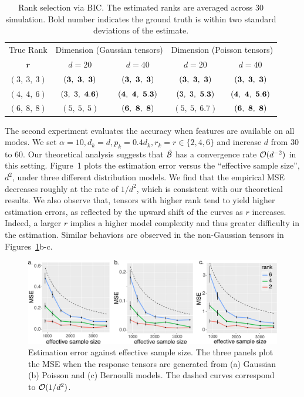 \documentclass[12pt]{article}
\theoremstyle{definition}
\theoremstyle{definition}
\begin{document}
\begin{table}[tb]
\centering
\begin{tabular}{|c|cc|cc|}
\hline
True Rank &\multicolumn{2}{c|}{Dimension (Gaussian tensors)}&\multicolumn{2}{c|}{Dimension (Poisson tensors)}\\
$\bm{r}$& $d=20$  &$d=40$&$d=20$ &$d=40$\\
\hline
$(3,\ 3,\ 3)$&$({\bf 3},\ {\bf 3},\ {\bf 3})$&$({\bf 3},\ {\bf 3},\ {\bf 3})$& $({\bf 3},\ {\bf 3},\ {\bf 3})$ & $({\bf 3},\ {\bf 3},\ {\bf 3})$\\
$(4,\ 4,\ 6)$&$(3,\ 3,\ {\bf 4.6})$&$({\bf 4},\ {\bf 4},\ {\bf 5.3})$&$(3,\ 3,\ {\bf 5.3})$&$({\bf 4},\ {\bf 4},\ {\bf 5.6})$\\
$(6,\ 8,\ 8)$&$(5,\ 5,\ 5)$&$({\bf 6},\ {\bf 8},\ {\bf 8})$&$(5,\ 5,\ 6.7)$&$({\bf 6},\ {\bf 8},\ {\bf 8})$\\
\hline
\end{tabular}
\caption{Rank selection via BIC. The estimated ranks are averaged across 30 simulation. Bold number indicates the ground truth is within two standard deviations of the estimate.}\label{tab:rank}
\end{table}


The second experiment evaluates the accuracy when features are available on all modes. We set $\alpha=10, d_k=d, p_k=0.4d_k, r_k=r\in\{2,4,6\}$ and increase $d$ from 30 to 60. Our theoretical analysis suggests that $\hat {\mathcal{B}}$ has a convergence rate $\mathcal{O}(d^{-2})$ in this setting. Figure~1 plots the estimation error versus the ``effective sample size'', $d^2$, under three different distribution models. We find that the empirical MSE decreases roughly at the rate of $1/d^2$, which is consistent with our theoretical results. We also observe that, tensors with higher rank tend to yield higher estimation errors, as reflected by the upward shift of the curves as $r$ increases. Indeed, a larger $r$ implies a higher model complexity and thus greater difficulty in the estimation. Similar behaviors are observed in the non-Gaussian tensors in Figures~\ref{fig:dim}b-c. 

\begin{figure}[ht]
\centering
\includegraphics[width=15cm]{dimension.pdf}
\caption{Estimation error against effective sample size. The three panels plot the MSE when the response tensors are generated from (a) Gaussian (b) Poisson and (c) Bernoulli models. The dashed curves correspond to $\mathcal{O}({1/d^2})$.}\label{fig:dim}
\end{figure}
\end{document}
